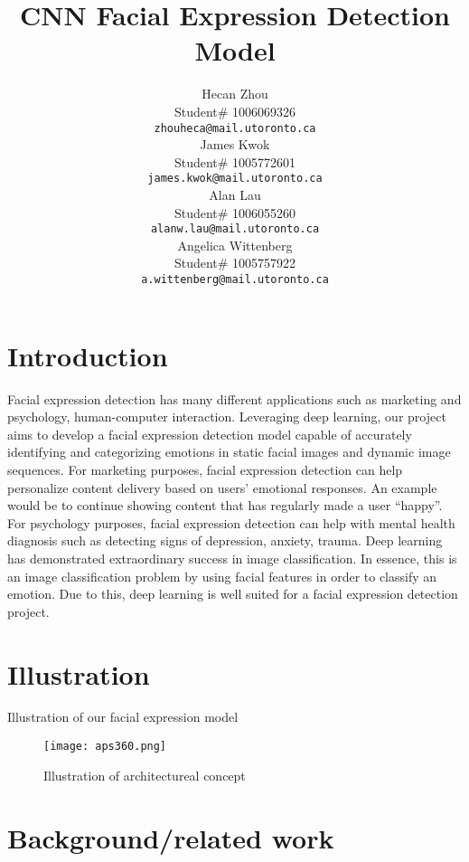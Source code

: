 \documentclass{article} %
\title{CNN Facial Expression Detection Model}
\author{Hecan Zhou  \\
Student\# 1006069326\\
\texttt{zhouheca@mail.utoronto.ca} \\
\And
James Kwok  \\
Student\# 1005772601 \\
\texttt{james.kwok@mail.utoronto.ca} \\
\AND
Alan Lau  \\
Student\# 1006055260 \\
\texttt{alanw.lau@mail.utoronto.ca} \\
\And
Angelica Wittenberg \\
Student\# 1005757922 \\
\texttt{a.wittenberg@mail.utoronto.ca} \\
\AND
}
\begin{document}
\maketitle

\section{Introduction }
Facial expression detection has many different applications such as marketing and psychology, human-computer interaction. Leveraging deep learning, our project aims to develop a facial expression detection model capable of accurately identifying and categorizing emotions in static facial images and dynamic image sequences. For marketing purposes, facial expression detection can help personalize content delivery based on users' emotional responses. An example would be to continue showing content that has regularly made a user “happy”. For psychology purposes, facial expression detection can help with mental health diagnosis such as detecting signs of depression, anxiety, trauma. Deep learning has demonstrated extraordinary success in image classification. In essence, this is an image classification problem by using facial features in order to classify an emotion. Due to this, deep learning is well suited for a facial expression detection project.

\section{Illustration }
Illustration of our facial expression model

\begin{figure}[h]
\begin{center}
\texttt{[image: aps360.png]}
\end{center}
\caption{Illustration of architectureal concept}
\end{figure}


\section{Background/related work}
\end{document}
